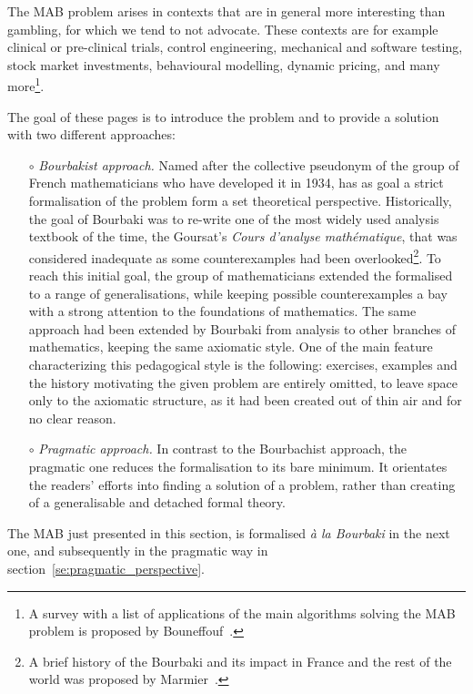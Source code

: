 \documentclass[]{scrartcl}
\theoremstyle{definition}
\begin{document}
The MAB problem arises in contexts that are in general more interesting than gambling, for which we tend to not advocate. These contexts are for example clinical or pre-clinical trials, control engineering, mechanical and software testing, stock market investments, behavioural modelling, dynamic pricing, and many more\footnote{
    A survey with a list of applications of the main algorithms solving the MAB problem is proposed by Bouneffouf~\cite{bf2019survey}.
}.

The goal of these pages is to introduce the problem and to provide a solution with two different approaches:
\begin{itemize}
    \item[$\circ$] \emph{Bourbakist approach.} Named after the collective pseudonym of the group of French mathematicians who have developed it in 1934, has as goal a strict formalisation of the problem form a set theoretical perspective. Historically, the goal of Bourbaki was to re-write one of the most widely used analysis textbook of the time, the Goursat’s \emph{Cours d'analyse mathématique}, that was considered inadequate as some counterexamples had been overlooked\footnote{A brief history of the Bourbaki and its impact in France and the rest of the world was proposed by Marmier~\cite{marmier2014idea}.}. To reach this initial goal, the group of mathematicians extended the formalised to a range of generalisations, while keeping possible counterexamples a bay with a strong attention to the foundations of mathematics. The same approach had been extended by Bourbaki from analysis to other branches of mathematics, keeping the same axiomatic style. One of the main feature characterizing this pedagogical style is the following: exercises, examples and the history motivating the given problem are entirely omitted, to leave space only to the axiomatic structure, as it had been created out of thin air and for no clear reason.
    \item[$\circ$] \emph{Pragmatic approach.} In contrast to the Bourbachist approach, the pragmatic one reduces the formalisation to its bare minimum. It orientates the readers' efforts into finding a solution of a problem, rather than creating of a generalisable and detached formal theory.
\end{itemize}
The MAB just presented in this section, is formalised \emph{à la Bourbaki} in the next one, and subsequently in the pragmatic way in section~\ref{se:pragmatic_perspective}.

\end{document}
